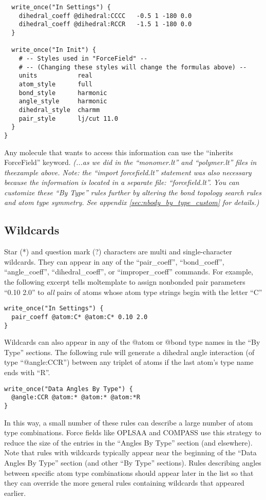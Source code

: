 \documentclass[11pt]{article}
\begin{document}
\begin{verbatim}
  write_once("In Settings") {
    dihedral_coeff @dihedral:CCCC   -0.5 1 -180 0.0
    dihedral_coeff @dihedral:RCCR   -1.5 1 -180 0.0
  }

  write_once("In Init") {
    # -- Styles used in "ForceField" --
    # -- (Changing these styles will change the formulas above) --
    units           real
    atom_style      full
    bond_style      harmonic
    angle_style     harmonic
    dihedral_style  charmm
    pair_style      lj/cut 11.0
  }
}
\end{verbatim}
Any molecule that wants to access this information can use the
``inherits ForceField'' keyword.
\textit{(...as we did in the ``monomer.lt'' and ``polymer.lt'' files in theexample above.
 Note: the ``import forcefield.lt'' statement was also necessary because the
 information is located in a separate file: ``forcefield.lt''.}
\textit{You can customize these ``By Type'' rules further
  by altering the bond topology search rules and atom type symmetry.
  See appendix \ref{sec:nbody_by_type_custom} for details.)}


\subsection{Wildcards}
Star (*) and question mark (?) characters are multi and single-character
wildcards.
They can appear in any of the
``pair\_coeff'', ``bond\_coeff'', ``angle\_coeff'',
``dihedral\_coeff'', or ``improper\_coeff'' commands.
For example, the following excerpt tells moltemplate to assign nonbonded
pair parameters ``0.10 2.0'' to \textit{all} pairs of atoms whose
atom type strings begin with the letter ``C''
\begin{verbatim}
write_once("In Settings") {
  pair_coeff @atom:C* @atom:C* 0.10 2.0
}
\end{verbatim}
Wildcards can also appear in any of the @atom or @bond type names
in the ``By Type'' sections.
The following rule will generate a dihedral angle interaction
(of type ``@angle:CCR'') between any triplet of atoms if the last
atom's type name ends with ``R''.
\begin{verbatim}
write_once("Data Angles By Type") {
  @angle:CCR @atom:* @atom:* @atom:*R
}
\end{verbatim}
In this way, a small number of these rules can describe
a large number of atom type combinations.
Force fields like OPLSAA and COMPASS use this strategy to reduce the size
of the entries in the ``Angles By Type'' section (and elsewhere).
Note that rules with wildcards typically appear near the beginning of the
``Data Angles By Type'' section (and other ``By Type'' sections).
Rules describing angles between specific atom type combinations
should appear later in the list so that they can override the
more general rules containing wildcards that appeared earlier.
\end{document}
